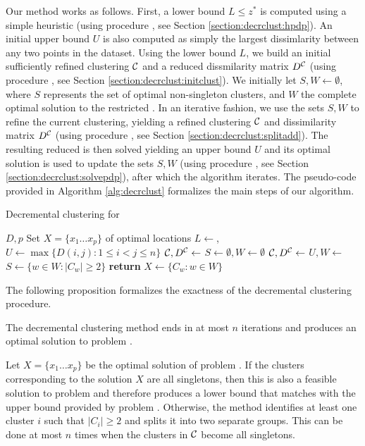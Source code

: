 \documentclass[ijoo,nonblindrev]{informs-ijoo}
\begin{document}
Our method works as follows. First, a lower bound $L \leq z^*$ is computed using a simple heuristic (using procedure , see Section \ref{section:decrclust:hpdp}). An initial upper bound $U$ is also computed as simply the largest dissimlarity between any two points in the dataset. Using the lower bound $L$, we build an initial sufficiently refined clustering $\mathcal{C}$ and a reduced dissmilarity matrix $D^{\mathcal{C}}$ (using procedure , see Section \ref{section:decrclust:initclust}). We initially let $S, W\leftarrow\emptyset$, where $S$ represents the set of optimal non-singleton clusters, and $W$ the complete optimal solution to the restricted \pDP{}. In an iterative fashion, we use the sets $S, W$ to refine the current clustering, yielding a refined clustering $\mathcal{C}$ and dissimilarity matrix $D^{\mathcal{C}}$ (using procedure , see Section \ref{section:decrclust:splitadd}). The resulting reduced \pDP{} is then solved yielding an upper bound $U$ and its optimal solution is used to update the sets $S, W$ (using procedure , see Section \ref{section:decrclust:solvepdp}), after which the algorithm iterates. The pseudo-code provided in 
Algorithm \ref{alg:decrclust} formalizes the main steps of our algorithm.%

\begin{algorithm}[H]
	\caption{Decremental clustering for \label{alg:decrclust}}
	\begin{algorithmic}\normalsize
		\Require $D, p$
		\Ensure Set $X = \{x_1\ldots x_p\}$ of optimal locations
		\State $L\leftarrow$, $U\leftarrow\max\{D(i, j): 1\leq i < j \leq n\}$
		\State $\mathcal{C}, D^{\mathcal{C}}\leftarrow$
		\State $S\leftarrow\emptyset, W\leftarrow\emptyset$
		\Repeat
			\State $\mathcal{C}, D^{\mathcal{C}}\leftarrow$
			\State $U, W\leftarrow$%
			\State $S\leftarrow\{w\in W : |C_w| \geq 2\}$
		\State \textbf{return} $X\leftarrow\{C_w: w\in W\}$
	\end{algorithmic}
\end{algorithm}

The following proposition formalizes the exactness of the decremental clustering procedure.

\begin{proposition}\label{proposition:prop1}
	The decremental clustering method ends in at most $n$ iterations and produces an optimal solution to problem .
\end{proposition}
	Let $X = \{x_1\ldots x_p\}$ be the optimal solution of problem . If the clusters corresponding to the solution $X$ are all singletons, then this is also a feasible solution to problem  and therefore produces a lower bound that matches with the upper bound provided by problem . Otherwise, the method identifies at least one cluster $i$ such that $|C_i| \geq 2$ and splits it into two separate groups. This can be done at most $n$ times when the clusters in $\mathcal{C}$ become all singletons.\Halmos
\endproof
\end{document}
